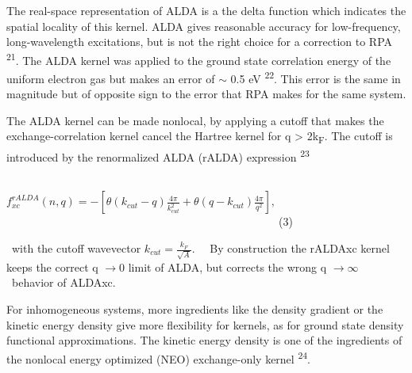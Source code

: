 \documentclass[12pt]{article}
\renewcommand{\_}{\kern-1.5pt\textunderscore\kern-1.5pt}
\begin{document}
\begin{justify}
The real-space representation of ALDA is a the delta function which indicates the spatial locality of this kernel. ALDA gives reasonable accuracy for low-frequency, long-wavelength excitations, but is not the right choice for a correction to RPA \textsuperscript{21}. The ALDA kernel was applied to the ground state correlation energy of the uniform electron gas but makes an error of $ \sim $ 0.5 eV \textsuperscript{22}. This error is the same in magnitude but of opposite sign to the error that RPA makes for the same system.
\end{justify}\par

\begin{justify}
The ALDA kernel can be made nonlocal, by applying a cutoff that makes the exchange-correlation kernel cancel the Hartree kernel for q > 2k\textsubscript{F}. The cutoff is introduced by the renormalized ALDA (rALDA) expression \textsuperscript{23}
\end{justify}\par


\vspace{\baselineskip}
\setlength{\parskip}{9.96pt}
\setlength{\parskip}{0.0pt}
\begin{Center}
\ \ \ \ \ \ \ \ \ \ \ \ \ \ \ \ \ \ \ \ \ \ \ \ \ \ \ \ \   \( f_{xc}^{rALDA} \left( n,q \right) =- \left[  \theta  \left( k_{cut}-q \right) \frac{4 \pi }{k_{cut}^{2}}+ \theta  \left( q-k_{cut} \right) \frac{4 \pi }{q^{2}} \right] , \) \ \ \ \ \ \ \ \ \ \ \ \ \ \ \ \ \ \ \ \ \ \ \ \ \ \ \ \ \ \ \ \ \ \ \ \ \ \ \ \ \ \ \ \ \ \ \ \ \  (3)
\end{Center}\par


\vspace{\baselineskip}
\setlength{\parskip}{9.96pt}
\setlength{\parskip}{0.0pt}
\begin{justify}
\ with the cutoff wavevector   \( k_{cut}=\frac{k_{F}}{\sqrt{A}}. \) \ \ By construction the rALDAxc kernel keeps the correct  q \(  \rightarrow 0 \)  limit of ALDA, but corrects the wrong q \(  \rightarrow \infty \) \  behavior of ALDAxc.\  
\end{justify}\par

\begin{justify}
For inhomogeneous systems, more ingredients like the density gradient or the kinetic energy density give more flexibility for kernels, as for ground state density functional approximations. The kinetic energy density is one of the ingredients of the nonlocal energy optimized (NEO) exchange-only kernel \textsuperscript{24}.
\end{justify}\par
\end{document}
